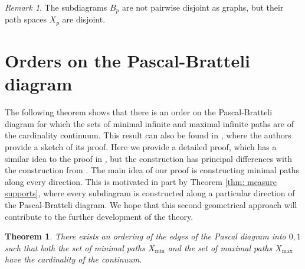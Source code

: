 \documentclass[11pt, twoside]{amsart}
\theoremstyle{definition}
\theoremstyle{remark}
\newtheorem{remark}[definition]{Remark}
\theoremstyle{plain}
\newtheorem{thm}[definition]{Theorem}
\newcommand{\tcr}{\textcolor{red}}
\numberwithin{equation}{section}
\begin{document}
\begin{remark}
    The subdiagrams $B_p$ are not pairwise disjoint as graphs, but their path spaces $X_p$ are disjoint.
\end{remark}


\section{Orders on the Pascal-Bratteli diagram}
\label{Sect:X_max_X_min}


The following theorem shows that there is an order on the Pascal-Bratteli diagram for which the sets of minimal infinite and maximal infinite paths are of the cardinality continuum. This result can also be found in \cite[Example 7.2]{Fricketal2017},  where the authors provide a sketch of its proof. Here we provide a detailed proof, which has a similar idea to the proof in \cite{Fricketal2017}, but the construction has principal differences with the construction from \cite{Fricketal2017}. The main idea of our proof is constructing minimal paths along every direction. This is motivated in part by Theorem \ref{thm: measure supports}, where every subdiagram is constructed along a particular direction of the Pascal-Bratteli diagram. We hope that this second geometrical approach will contribute to the further development of the theory.

\begin{thm}\label{thm: continuum Xmin} There exists an ordering of the edges of the Pascal diagram into $0,1$ such that both the set of minimal paths $X_{\min}$ and the set of maximal paths $X_{\max}$ have the cardinality of the continuum.
\end{thm}
\end{document}
